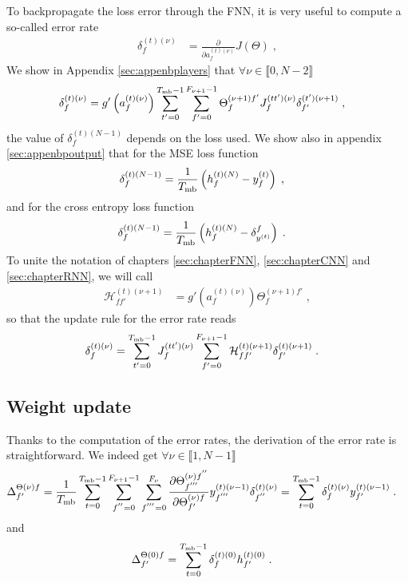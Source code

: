 To backpropagate the loss error through the FNN, it is very useful to compute a so-called error rate
\begin{align}
\delta^{(t)(\nu)}_f&= \frac{\partial }{\partial  a_{f}^{(t)(\nu)}}J(\Theta)\;,
\end{align}
We show in Appendix \ref{sec:appenbplayers} that $\forall \nu \in \llbracket 0,N-2\rrbracket$
\begin{align}
\delta^{(t)(\nu)}_f&=g'\left(a_{f}^{(t)(\nu)}\right)
%
\sum_{t'=0}^{T_{{\rm mb}}-1}\sum_{f'=0}^{F_{\nu+1}-1}\Theta^{(\nu+1)f'}_{f}J^{(tt')(\nu)}_{f} \delta^{(t')(\nu+1)}_{f'}\;,
\end{align}
the value of $\delta^{(t)(N-1)}_f$ depends on the loss used. We show also in appendix \ref{sec:appenbpoutput} that for the MSE loss function
\begin{align}
\delta^{(t)(N-1)}_f&= \frac{1}{T_{{\rm mb}}}\left(h_{f}^{(t)(N)}-y_f^{(t)}\right)\;,
\end{align}
and for the cross entropy loss function
\begin{align}
\delta^{(t)(N-1)}_{f}&= \frac{1}{T_{{\rm mb}}}\left(h_{f}^{(t)(N)}-\delta^f_{y^{(t)}}\right)\;.
\end{align}
To unite the notation of chapters \ref{sec:chapterFNN}, \ref{sec:chapterCNN} and \ref{sec:chapterRNN}, we will call 
\begin{align}
\mathcal{H}^{(t)(\nu+1)}_{ff'}&=g'\left(a_{f}^{(t)(\nu)}\right)\Theta^{(\nu+1)f'}_{f}\;,
\end{align}
so that the update rule for the error rate reads 
\begin{align}
\delta^{(t)(\nu)}_f&=
%
\sum_{t'=0}^{T_{{\rm mb}}-1}J^{(tt')(\nu)}_{f}\sum_{f'=0}^{F_{\nu+1}-1}\mathcal{H}^{(t)(\nu+1)}_{ff'} \delta^{(t)(\nu+1)}_{f'}\;.
\end{align}

\subsection{Weight update}

Thanks to the computation of the error rates, the derivation of the error rate is straightforward. We indeed get $\forall \nu \in \llbracket 1,N-1\rrbracket$
\begin{align}
\Delta^{\Theta(\nu)f}_{f'}&=\frac{1}{T_{{\rm mb}}}\sum_{t=0}^{T_{{\rm mb}}-1}
%
\sum^{F_{\nu+1}-1}_{f^{''}=0}\sum^{F_\nu}_{f^{'''}=0}\frac{\partial\Theta^{(\nu)f^{''}}_{f^{'''}}
%
}{\partial \Theta^{(\nu)f}_{f'}}y^{(t)(\nu-1)}_{f^{'''}}\delta^{(t)(\nu)}_{f^{''}}
%
=\sum_{t=0}^{T_{{\rm mb}}-1}\delta^{(t)(\nu)}_f y^{(t)(\nu-1)}_{f'}\;.
\end{align}
and 
\begin{align}
\Delta^{\Theta(0)f}_{f'}&=\sum_{t=0}^{T_{{\rm mb}}-1}\delta^{(t)(0)}_f h^{(t)(0)}_{f'}\;.
\end{align}


